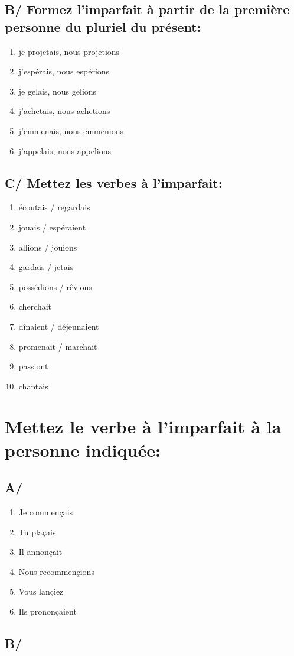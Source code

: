 \subsection{B/ Formez l'imparfait à partir de la première personne du pluriel du présent:}

\begin{enumerate}
    \item je projetais, nous projetions
    \item j'espérais, nous espérions
    \item je gelais, nous gelions
    \item j'achetais, nous achetions
    \item j'emmenais, nous emmenions
    \item j'appelais, nous appelions
\end{enumerate}

\subsection{C/ Mettez les verbes à l'imparfait:}

\begin{enumerate}
    \item écoutais / regardais
    \item jouais / espéraient
    \item allions / jouions
    \item gardais / jetais
    \item possédions / rêvions
    \item cherchait 
    \item dînaient / déjeunaient
    \item promenait / marchait
    \item passiont
    \item chantais
\end{enumerate}

\section{Mettez le verbe à l'imparfait à la personne indiquée:}

\subsection{A/}

\begin{enumerate}
    \item Je commençais
    \item Tu plaçais
    \item Il annonçait
    \item Nous recommençions
    \item Vous lançiez
    \item Ils prononçaient
\end{enumerate}

\subsection{B/}